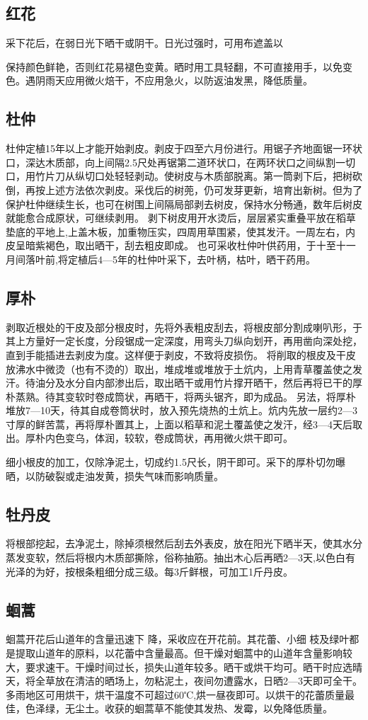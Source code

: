 \documentclass{ctexbook}
\begin{document}
\subsection{红花}
采下花后，在弱日光下晒干或阴干。日光过强时，可用布遮盖以

保持颜色鲜艳，否则红花易褪色变黄。晒时用工具轻翻，不可直接用手，以免变色。遇阴雨天应用微火焙干，不应用急火，以防返油发黑，降低质量。
\subsection{杜仲}
杜仲定植15年以上才能开始剥皮。剥皮于四至六月份进行。用锯子齐地面锯一环状口，深达木质部，向上间隔2.5尺处再锯第二道环状口，在两环状口之间纵割一切口，用竹片刀从纵切口处轻轻剥动。使树皮与木质部脱离。第一筒剥下后，把树砍倒，再按上述方法依次剥皮。采伐后的树蔸，仍可发芽更新，培育出新树。但为了保护杜仲继续生长，也可在树围上间隔局部剥去树皮，保持水分畅通，数年后树皮就能愈合成原状，可继续剥用。
剥下树皮用开水烫后，层层紧实重叠平放在稻草垫底的平地上,上盖木板，加重物压实，四周用草围紧，使其发汗。一周左右，内皮呈暗紫褐色，取出晒干，刮去粗皮即成。
也可采收杜仲叶供药用，于十至十一月间落叶前,将定植后4—5年的杜仲叶采下，去叶柄，枯叶，晒干药用。
\subsection{厚朴}
剥取近根处的干皮及部分根皮时，先将外表粗皮刮去，将根皮部分割成喇叭形，于其上方量好一定长度，分段锯成一定深度，用弯头刀纵向划开，再用凿向深处挖，直到手能插进去剥皮为度。这样便于剥皮，不致将皮损伤。
将削取的根皮及干皮放沸水中微烫（也有不烫的）取出，堆成堆或堆放于土炕内，上用青草覆盖使之发汗。待油分及水分自内部渗出后，取出晒干或用竹片撑开晒干，然后再将已干的厚朴蒸熟。待其变软时卷成筒状，再晒干，将两头锯齐，即为成品。
另法，将厚朴堆放7—10天，待其自成卷筒状时，放入预先烧热的土炕上。炕内先放一层约2—3寸厚的鲜苦蒿，再将厚朴置其上，上面以稻草和泥土覆盖使之发汗，经3—4天后取出。厚朴内色变乌，体润，较软，卷成筒状，再用微火烘干即可。

细小根皮的加工，仅除净泥土，切成约1.5尺长，阴干即可。采下的厚朴切勿曝晒，以防破裂或走油发黄，损失气味而影响质量。
\subsection{牡丹皮}
将根部挖起，去净泥土，除掉须根然后刮去外表皮，放在阳光下晒半天，使其水分蒸发变软，然后将根内木质部撕除，俗称抽筋。抽出木心后再晒2—3天,以色白有光泽的为好，按根条粗细分成三级。每3斤鲜根，可加工1斤丹皮。
\subsection{蛔蒿}
蛔蒿开花后山道年的含量迅速下
降，采收应在开花前。其花蕾、小细
枝及绿叶都是提取山道年的原料，以花蕾中含量最高。但干燥对蛔蒿中的山道年含量影响较大，要求速干。干燥时间过长，损失山道年较多。晒干或烘干均可。晒干时应选晴天，将全草放在清洁的晒场上，勿粘泥土，夜间勿遭露水，日晒2—3天即可全干。多雨地区可用烘干，烘干温度不可超过60℃,烘一昼夜即可。以烘干的花蕾质量最佳，色泽绿，无尘土。收获的蛔蒿草不能使其发热、发霉，以免降低质量。
\end{document}
